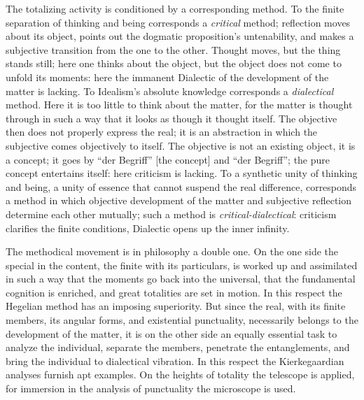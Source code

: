 \documentclass[12pt]{book}
\begin{document}
The totalizing activity is conditioned by a corresponding method. To the finite separation of thinking
and being corresponds a \emph{critical} method; reflection moves about its object, points out the
dogmatic proposition's untenability, and makes a subjective transition from the one to the other.
Thought moves, but the thing stands still; here one thinks about the object, but the object does not
come to unfold its moments: here the immanent Dialectic of the development of the matter is lacking. To
Idealism's absolute knowledge corresponds a \emph{dialectical} method. Here it is too little to think
about the matter, for the matter is thought through in such a way that it looks as though it thought
itself. The objective then does not properly express the real; it is an abstraction in which the
subjective comes objectively to itself. The objective is not an existing object, it is a concept; it goes
by ``der Begriff'' [the concept] and ``der Begriff''; the pure concept entertains itself: here criticism
is lacking. To a synthetic unity of thinking and being, a unity of essence that cannot suspend the real
difference, corresponds a method in which objective development of the matter and subjective reflection
determine each other mutually; such a method is \emph{critical-dialectical}: criticism clarifies the
finite conditions, Dialectic opens up the inner infinity.

The methodical movement is in philosophy a double one. On the one side the special in the content, the
finite with its particulars, is worked up and assimilated in such a way that the moments go back into the
universal, that the fundamental cognition is enriched, and great totalities are set in
motion. In this respect the Hegelian method has an imposing superiority. But since the real, with its
finite members, its angular forms, and existential punctuality, necessarily belongs to the development of
the matter, it is on the other side an equally essential task to analyze the individual, separate the
members, penetrate the entanglements, and bring the individual to dialectical vibration. In this respect
the Kierkegaardian analyses furnish apt examples. On the heights of totality the telescope is applied,
for immersion in the analysis of punctuality the microscope is used.
\end{document}

